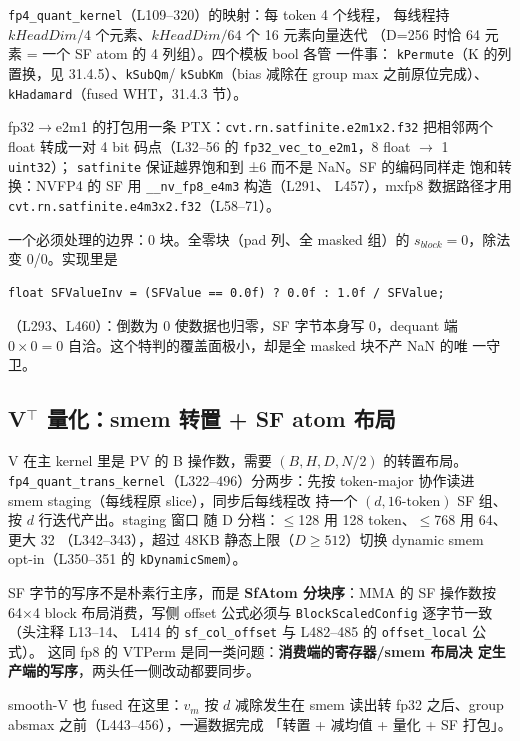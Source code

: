 \texttt{fp4\_quant\_kernel}（L109--320）的映射：每 token 4 个线程，
每线程持 $kHeadDim/4$ 个元素、$kHeadDim/64$ 个 16 元素向量迭代
（D=256 时恰 64 元素 = 一个 SF atom 的 4 列组）。四个模板 bool 各管
一件事：
\texttt{kPermute}（K 的列置换，见 31.4.5）、\texttt{kSubQm}/
\texttt{kSubKm}（bias 减除在 group max 之前原位完成）、
\texttt{kHadamard}（fused WHT，31.4.3 节）。

fp32$\to$e2m1 的打包用一条 PTX：\texttt{cvt.rn.satfinite.e2m1x2.f32}
把相邻两个 float 转成一对 4 bit 码点（L32--56 的
\texttt{fp32\_vec\_to\_e2m1}，8 float $\to$ 1 \texttt{uint32}）；
\texttt{satfinite} 保证越界饱和到 ±6 而不是 NaN。SF 的编码同样走
饱和转换：NVFP4 的 SF 用 \texttt{\_\_nv\_fp8\_e4m3} 构造（L291、
L457），mxfp8 数据路径才用
\texttt{cvt.rn.satfinite.e4m3x2.f32}（L58--71）。

一个必须处理的边界：0 块。全零块（pad 列、全 masked 组）的
$s_{block}=0$，除法变 0/0。实现里是
\begin{lstlisting}[style=console]
float SFValueInv = (SFValue == 0.0f) ? 0.0f : 1.0f / SFValue;
\end{lstlisting}
（L293、L460）：倒数为 0 使数据也归零，SF 字节本身写 0，dequant 端
$0\times0=0$ 自洽。这个特判的覆盖面极小，却是全 masked 块不产 NaN 的唯
一守卫。

\subsection{V$^\top$ 量化：smem 转置 + SF atom 布局}

V 在主 kernel 里是 PV 的 B 操作数，需要 $(B,H,D,N/2)$ 的转置布局。
\texttt{fp4\_quant\_trans\_kernel}（L322--496）分两步：先按
token-major 协作读进 smem staging（每线程原 slice），同步后每线程改
持一个 $(d,16\text{-token})$ SF 组、按 $d$ 行迭代产出。staging 窗口
随 D 分档：$\le$128 用 128 token、$\le$768 用 64、更大 32
（L342--343），超过 48KB 静态上限（$D\ge512$）切换 dynamic smem
opt-in（L350--351 的 \texttt{kDynamicSmem}）。

SF 字节的写序不是朴素行主序，而是 \textbf{SfAtom 分块序}：MMA 的 SF
操作数按 64$\times$4 block 布局消费，写侧 offset 公式必须与
\texttt{BlockScaledConfig} 逐字节一致（头注释 L13--14、
L414 的 \texttt{sf\_col\_offset} 与 L482--485 的
\texttt{offset\_local} 公式）。
这同 fp8 的 VTPerm 是同一类问题：\textbf{消费端的寄存器/smem 布局决
定生产端的写序}，两头任一侧改动都要同步。

smooth-V 也 fused 在这里：$v_m$ 按 $d$ 减除发生在 smem 读出转 fp32
之后、group absmax 之前（L443--456），一遍数据完成
「转置 + 减均值 + 量化 + SF 打包」。

